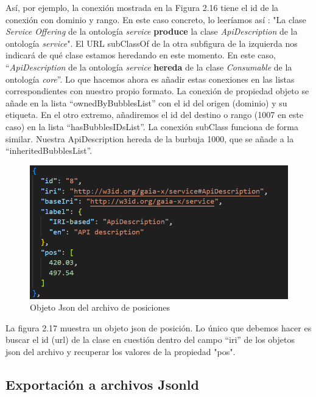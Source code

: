 Así, por ejemplo, la conexión mostrada en la Figura 2.16 tiene el id de la conexión con dominio y rango. En este caso concreto, lo leeríamos así : "La clase \textit{Service Offering} de la ontología \textit{service} \textbf{produce} la clase \textit{ApiDescription} de la ontología \textit{service}". 
El URL subClassOf de la otra subfigura de la izquierda nos indicará de qué clase estamos heredando en este momento. En este caso, ``\textit{ApiDescription} de la ontología \textit{service} \textbf{hereda} de la clase \textit{Consumable} de la ontología \textit{core}''. Lo que hacemos ahora es añadir estas conexiones en las listas correspondientes con nuestro propio formato. La conexión de propiedad objeto se añade en la lista ``ownedByBubblesList'' con el id del origen (dominio) y su etiqueta. En el otro extremo, añadiremos el id del destino o rango (1007 en este caso) en la lista ``hasBubblesIDsList''. La conexión subClass
funciona de forma similar. Nuestra ApiDescription hereda de la burbuja 1000, que se añade a la ``inheritedBubblesList''.



\begin{figure}[ht]
   \begin{center}
      \includegraphics[width=0.7\linewidth]{chapter2/figures/position.png}
   \end{center}
   \caption[Objeto Json del archivo de posiciones]
   {\footnotesize Objeto Json del archivo de posiciones}
\end{figure}

La figura 2.17 muestra un objeto json de posición. Lo único que debemos hacer es buscar el id (url) de la clase en cuestión dentro del campo ``iri'' de los objetos json del archivo y recuperar los valores de la propiedad "pos".

\subsection{Exportación a archivos Jsonld}

